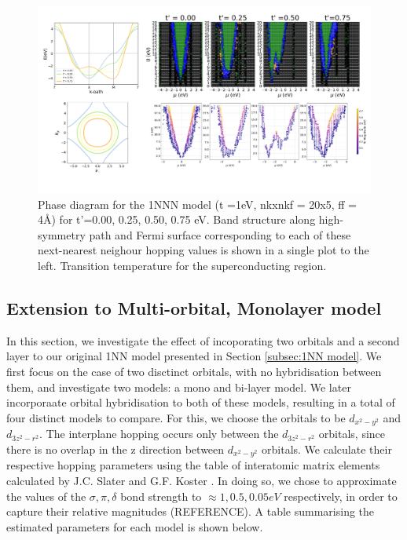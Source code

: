 \documentclass[12pt]{article}
\begin{document}
\begin{figure}[htbp]  %
    \centering
    \includegraphics[width=1.0\textwidth]{1NNN_dat.png}  %
    \caption{Phase diagram for the 1NNN model (t =1eV, nkxnkf = 20x5, ff = 4\AA) for t'=0.00, 0.25, 0.50, 0.75 eV. Band structure along high-symmetry path and Fermi surface corresponding to each of these next-nearest neighour hopping values is shown in a single plot to the left. Transition temperature for the superconducting region. }
    \label{fig:1NNNpd}
\end{figure}


\subsection{Extension to Multi-orbital, Monolayer model}

In this section, we investigate the effect of incoporating two orbitals and a second layer to our original 1NN model presented in Section \ref{subsec:1NN model}. 
We first focus on the case of two disctinct orbitals, with no hybridisation between them, and investigate two models: a mono and bi-layer model. We later incorporaate orbital hybridisation to both of these models, resulting in a total of four distinct models to compare. 
For this, we choose the orbitals to be $d_{x^2-y^2}$ and $d_{3z^2 -r^2}$. The interplane hopping occurs only between the $d_{3z^2-r^2}$ orbitals, since there is no overlap in the z direction between $d_{x^2-y^2}$ orbitals. 
We calculate their respective hopping parameters using the table of interatomic matrix elements calculated by J.C. Slater and G.F. Koster \cite{slater1954simplified}. In doing so, we chose to approximate the 
values of the $\sigma,  \pi, \delta$ bond strength to  $\approx  1, 0.5, 0.05eV$ respectively, in order to capture their relative magnitudes (REFERENCE). A table summarising the estimated parameters for each model is shown below.
\end{document}
